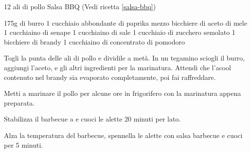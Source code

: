 \begin{ingreds}
	12 ali di pollo
	Salsa BBQ (Vedi ricetta \ref{salsa-bbq})

\columnbreak
{}
	175g di burro
	1 cucchiaio abbondante di paprika
	mezzo bicchiere di aceto di mele
	1 cucchiaino di senape
	1 cucchiaino di sale
	1 cucchiaio di zucchero semolato
	1 bicchiere di brandy
	1 cucchiaino di concentrato di pomodoro
\end{ingreds}

\begin{method}
Togli la punta delle ali di pollo e dividile a metà. In un tegamino sciogli il burro, aggiungi l'aceto, e gli altri ingredienti per la marinatura. Attendi che l'acool contenuto nel brandy sia evaporato completamente, poi fai raffreddare.

Metti a marinare il pollo per alcune ore in frigorifero con la marinatura appena preparata.

Stabilizza il barbecue a  e cuoci le alette 20 minuti per lato.

Alza la temperatura del barbecue, spennella le alette con salsa barbecue e cuoci per 5 minuti.
\end {method}
